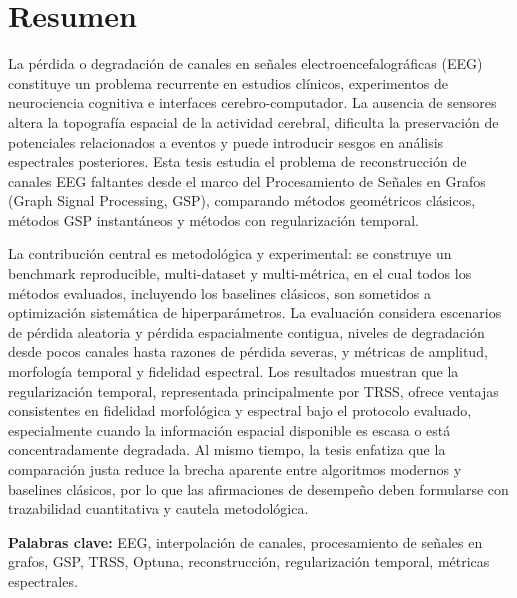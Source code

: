 \chapter*{Resumen}
La pérdida o degradación de canales en señales electroencefalográficas (EEG) constituye un problema recurrente en estudios clínicos, experimentos de neurociencia cognitiva e interfaces cerebro-computador. La ausencia de sensores altera la topografía espacial de la actividad cerebral, dificulta la preservación de potenciales relacionados a eventos y puede introducir sesgos en análisis espectrales posteriores. Esta tesis estudia el problema de reconstrucción de canales EEG faltantes desde el marco del Procesamiento de Señales en Grafos (Graph Signal Processing, GSP), comparando métodos geométricos clásicos, métodos GSP instantáneos y métodos con regularización temporal.

La contribución central es metodológica y experimental: se construye un benchmark reproducible, multi-dataset y multi-métrica, en el cual todos los métodos evaluados, incluyendo los baselines clásicos, son sometidos a optimización sistemática de hiperparámetros. La evaluación considera escenarios de pérdida aleatoria y pérdida espacialmente contigua, niveles de degradación desde pocos canales hasta razones de pérdida severas, y métricas de amplitud, morfología temporal y fidelidad espectral. Los resultados muestran que la regularización temporal, representada principalmente por TRSS, ofrece ventajas consistentes en fidelidad morfológica y espectral bajo el protocolo evaluado, especialmente cuando la información espacial disponible es escasa o está concentradamente degradada. Al mismo tiempo, la tesis enfatiza que la comparación justa reduce la brecha aparente entre algoritmos modernos y baselines clásicos, por lo que las afirmaciones de desempeño deben formularse con trazabilidad cuantitativa y cautela metodológica.

\textbf{Palabras clave:} EEG, interpolación de canales, procesamiento de señales en grafos, GSP, TRSS, Optuna, reconstrucción, regularización temporal, métricas espectrales.
